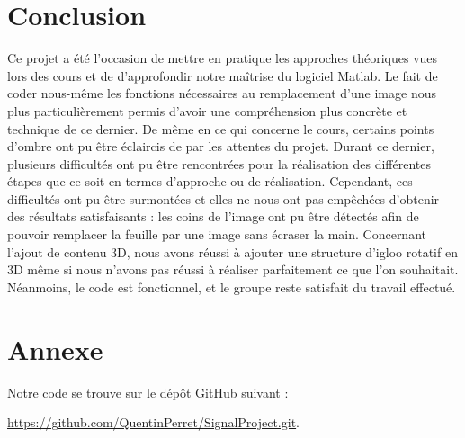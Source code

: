 \documentclass[blue]{ceri/sty/rapport}
\begin{document}
\section{Conclusion}
Ce projet a été l'occasion de mettre en pratique les approches théoriques vues lors des cours et de d'approfondir notre maîtrise du logiciel Matlab. Le fait de coder nous-même les fonctions nécessaires au remplacement d'une image nous plus particulièrement permis d'avoir une compréhension plus concrète et technique de ce dernier. De même en ce qui concerne le cours, certains points d'ombre ont pu être éclaircis de par les attentes du projet. 
Durant ce dernier, plusieurs difficultés ont pu être rencontrées pour la réalisation des différentes étapes que ce soit en termes d'approche ou de réalisation. Cependant, ces difficultés ont pu être surmontées et elles ne nous ont pas empêchées d'obtenir des résultats satisfaisants : les coins de l'image ont pu être détectés afin de pouvoir remplacer la feuille par une image sans écraser la main. Concernant l'ajout de contenu 3D, nous avons réussi à ajouter une structure d'igloo rotatif en 3D même si nous n'avons pas réussi à réaliser parfaitement ce que l'on souhaitait. Néanmoins, le code est fonctionnel, et le groupe reste satisfait du travail effectué.

\section{Annexe}
Notre code se trouve sur le dépôt GitHub suivant : 

\url{https://github.com/QuentinPerret/SignalProject.git}.

\MyBibliography
\end{document}
